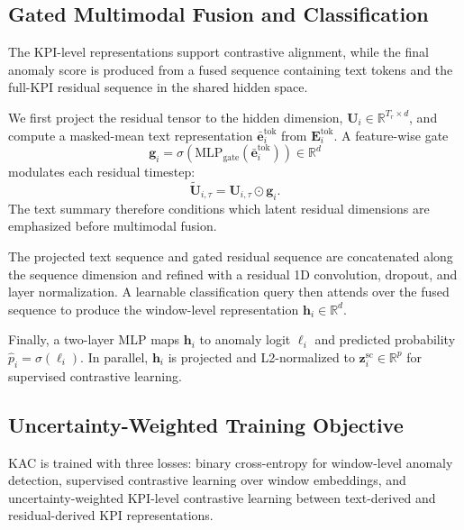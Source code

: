 \documentclass[conference]{IEEEtran}
\begin{document}
\subsection{Gated Multimodal Fusion and Classification}
\label{sec:fusion}

The KPI-level representations support contrastive alignment, while the final anomaly score is produced from a fused sequence containing text tokens and the full-KPI residual sequence in the shared hidden space.

We first project the residual tensor to the hidden dimension,
$\mathbf{U}_i \in \mathbb{R}^{T_r \times d}$,
and compute a masked-mean text representation $\bar{\mathbf{e}}^{\mathrm{tok}}_i$ from $\mathbf{E}^{\mathrm{tok}}_i$.
A feature-wise gate
\begin{equation}
\mathbf{g}_i
=
\sigma(\mathrm{MLP}_{\mathrm{gate}}(\bar{\mathbf{e}}^{\mathrm{tok}}_i))
\in
\mathbb{R}^{d}
\end{equation}
modulates each residual timestep:
\begin{equation}
\tilde{\mathbf{U}}_{i,\tau}
=
\mathbf{U}_{i,\tau}
\odot
\mathbf{g}_i.
\end{equation}
The text summary therefore conditions which latent residual dimensions are emphasized before multimodal fusion.

The projected text sequence and gated residual sequence are concatenated along the sequence dimension and refined with a residual 1D convolution, dropout, and layer normalization. A learnable classification query then attends over the fused sequence to produce the window-level representation $\mathbf{h}_i \in \mathbb{R}^{d}$.

Finally, a two-layer MLP maps $\mathbf{h}_i$ to anomaly logit $\ell_i$ and predicted probability $\hat{p}_i=\sigma(\ell_i)$. In parallel, $\mathbf{h}_i$ is projected and L2-normalized to $\mathbf{z}^{\mathrm{sc}}_i \in \mathbb{R}^{p}$ for supervised contrastive learning.

\subsection{Uncertainty-Weighted Training Objective}
\label{sec:objective}

KAC is trained with three losses: binary cross-entropy for window-level anomaly detection, supervised contrastive learning over window embeddings, and uncertainty-weighted KPI-level contrastive learning between text-derived and residual-derived KPI representations.
\end{document}
